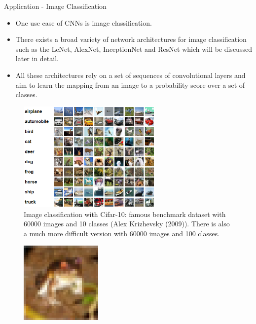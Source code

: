 





\newcommand{\titlefigure}{figure/alexnetfront.png}
\newcommand{\learninggoals}{
  \item Application of CNNs in Visual Recognition
}


\begin{vbframe}{Application - Image Classification}
    \begin{itemize}
        \item One use case of CNNs is image classification.
        \item There exists a broad variety of network architectures for image classification such as the LeNet, AlexNet, InceptionNet and ResNet which will be discussed later in detail.
        \item All these architectures rely on a set of sequences of convolutional layers and aim to learn the mapping from an image to a probability score over a set of classes.
    \end{itemize}
\framebreak
    \begin{figure}
        \centering
        \includegraphics[width=7cm]{figure/recognition.png}
        \caption{Image classification with Cifar-10: famous benchmark dataset with 60000 images and 10 classes (Alex Krizhevsky (2009)). There is also a much more difficult version with 60000 images and 100 classes.}
    \end{figure}
\framebreak
    \begin{figure}
        \centering
        \includegraphics[width=4cm]{figure/cifar_frog.png}

\end{figure}
\end{vbframe}
